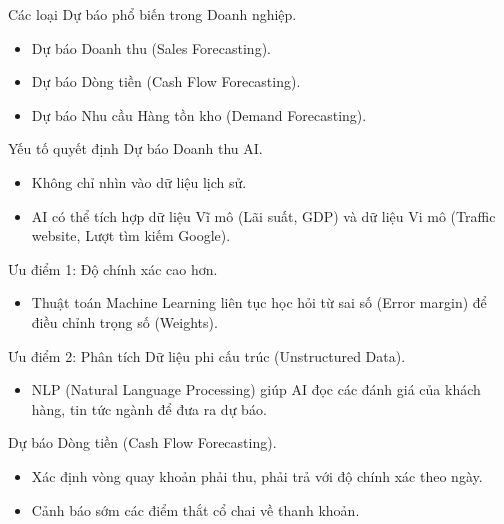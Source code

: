 \documentclass[aspectratio=169]{beamer}
\begin{document}
\begin{frame}{Các loại Dự báo phổ biến trong Doanh nghiệp.}
    \begin{itemize}
        \item Dự báo Doanh thu (Sales Forecasting).
        \item Dự báo Dòng tiền (Cash Flow Forecasting).
        \item Dự báo Nhu cầu Hàng tồn kho (Demand Forecasting).
    \end{itemize}
\end{frame}


\begin{frame}{Yếu tố quyết định Dự báo Doanh thu AI.}
    \begin{itemize}
        \item Không chỉ nhìn vào dữ liệu lịch sử.
        \item AI có thể tích hợp dữ liệu Vĩ mô (Lãi suất, GDP) và dữ liệu Vi mô (Traffic website, Lượt tìm kiếm Google).
    \end{itemize}
\end{frame}


\begin{frame}{Ưu điểm 1: Độ chính xác cao hơn.}
    \begin{itemize}
        \item Thuật toán Machine Learning liên tục học hỏi từ sai số (Error margin) để điều chỉnh trọng số (Weights).
    \end{itemize}
\end{frame}


\begin{frame}{Ưu điểm 2: Phân tích Dữ liệu phi cấu trúc (Unstructured Data).}
    \begin{itemize}
        \item NLP (Natural Language Processing) giúp AI đọc các đánh giá của khách hàng, tin tức ngành để đưa ra dự báo.
    \end{itemize}
\end{frame}


\begin{frame}{Dự báo Dòng tiền (Cash Flow Forecasting).}
    \begin{itemize}
        \item Xác định vòng quay khoản phải thu, phải trả với độ chính xác theo ngày.
        \item Cảnh báo sớm các điểm thắt cổ chai về thanh khoản.
    \end{itemize}
\end{frame}
\end{document}
